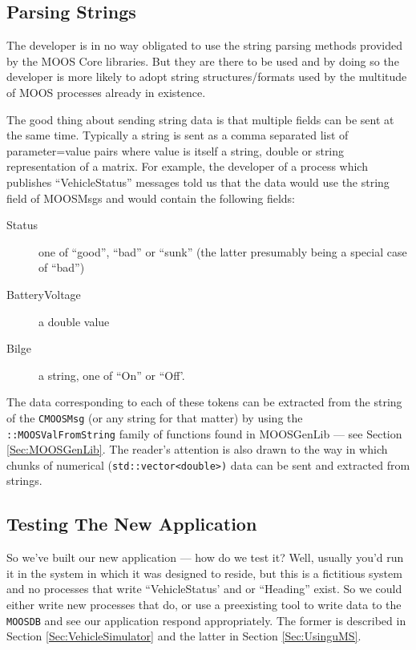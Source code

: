 \documentclass[a4paper,10pt]{article}
\newcommand{\Code}[1]{\texttt{#1} }
\newcommand{\code}[1]{\Code{#1} }
\begin{document}



\subsection{Parsing Strings} \label{Sec:StringParsing}

The developer is in no way obligated to use the string parsing
methods provided by the MOOS Core libraries. But they are there to
be used and by doing so the developer is more likely to adopt
string structures/formats used by the multitude of MOOS processes
already in existence.

The good thing about sending string data is that multiple fields
can be sent at the same time. Typically a string is sent as a
comma separated list of parameter=value pairs where value is
itself a string, double or string representation of a matrix. For
example, the developer of a process which publishes ``VehicleStatus''
messages told us that the data would use the string field of
MOOSMsgs and would contain the following fields:
\begin{description}
\item [Status] one of ``good'', ``bad'' or ``sunk'' (the latter
presumably being a special case of ``bad'')
\item [BatteryVoltage]  a double value
\item [Bilge] a string, one of ``On'' or ``Off'.
\end{description}


The data corresponding to each of these tokens can be extracted
from the string of the \code{CMOOSMsg} (or any string for that
matter) by using the \code{::MOOSValFromString} family of functions
found in MOOSGenLib --- see Section \ref{Sec:MOOSGenLib}. The
reader's attention is also drawn to the way in which chunks of
numerical (\code{std::vector<double>)} data can be sent and
extracted from strings.

\subsection{Testing The New Application}

So we've built our new application --- how do we test it? Well, usually you'd run it in the system in which it was designed to reside, but this is a fictitious system and no processes that write ``VehicleStatus' and or ``Heading'' exist. So we could either write new processes that do, or  use a preexisting tool to write data to the \code{MOOSDB} and see our application respond appropriately. The former is described in Section \ref{Sec:VehicleSimulator} and the latter in Section \ref{Sec:UsinguMS}.
\end{document}
